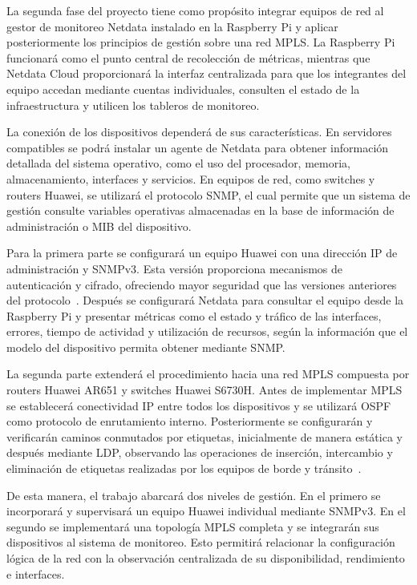 La segunda fase del proyecto tiene como propósito integrar equipos de red al
gestor de monitoreo Netdata instalado en la Raspberry Pi y aplicar
posteriormente los principios de gestión sobre una red MPLS. La Raspberry Pi
funcionará como el punto central de recolección de métricas, mientras que
Netdata Cloud proporcionará la interfaz centralizada para que los integrantes
del equipo accedan mediante cuentas individuales, consulten el estado de la
infraestructura y utilicen los tableros de monitoreo.

La conexión de los dispositivos dependerá de sus características. En servidores
compatibles se podrá instalar un agente de Netdata para obtener información
detallada del sistema operativo, como el uso del procesador, memoria,
almacenamiento, interfaces y servicios. En equipos de red, como switches y
routers Huawei, se utilizará el protocolo SNMP, el cual permite que un sistema
de gestión consulte variables operativas almacenadas en la base de información
de administración o MIB del dispositivo.

Para la primera parte se configurará un equipo Huawei con una dirección IP de
administración y SNMPv3. Esta versión proporciona mecanismos de autenticación
y cifrado, ofreciendo mayor seguridad que las versiones anteriores del
protocolo~\cite[sec.~1.3]{huawei-gestion-snmp}. Después se configurará Netdata para consultar el equipo desde la
Raspberry Pi y presentar métricas como el estado y tráfico de las interfaces,
errores, tiempo de actividad y utilización de recursos, según la
información que el modelo del dispositivo permita obtener mediante SNMP.

La segunda parte extenderá el procedimiento hacia una red MPLS compuesta por
routers Huawei AR651 y switches Huawei S6730H. Antes de implementar MPLS se
establecerá conectividad IP entre todos los dispositivos y se utilizará OSPF
como protocolo de enrutamiento interno. Posteriormente se configurarán y
verificarán caminos conmutados por etiquetas, inicialmente de manera estática
y después mediante LDP, observando las operaciones de inserción, intercambio y
eliminación de etiquetas realizadas por los equipos de borde y tránsito~\cite[partes~1--4]{guia-mpls-ar651-s6730h}.

De esta manera, el trabajo abarcará dos niveles de gestión. En el primero se
incorporará y supervisará un equipo Huawei individual mediante SNMPv3. En el
segundo se implementará una topología MPLS completa y se integrarán sus
dispositivos al sistema de monitoreo. Esto permitirá relacionar la
configuración lógica de la red con la observación centralizada de su
disponibilidad, rendimiento e interfaces.




